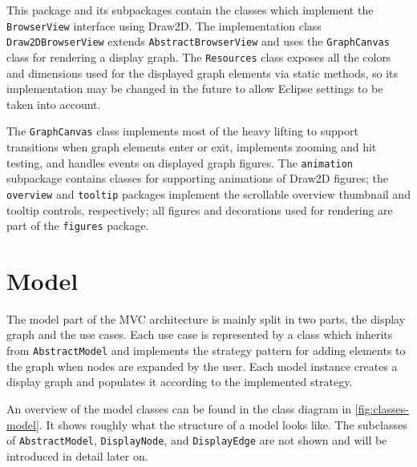 \begin{description}
   This package and its subpackages contain the classes which implement the 
  \lstinline|BrowserView| interface using Draw2D\footnotemark{}. The implementation class \lstinline|Draw2DBrowserView| 
  extends \lstinline|AbstractBrowserView| and uses the \lstinline|GraphCanvas| class for rendering a display graph. The 
  \lstinline|Resources| class exposes all the colors and dimensions used for the displayed graph elements via static 
  methods, so its implementation may be changed in the future to allow Eclipse settings to be taken into account.
  
  
  The \lstinline|GraphCanvas| class implements most of the heavy lifting to support transitions when graph elements 
  enter or exit, implements zooming and hit testing, and handles events on displayed graph figures. The 
  \lstinline|animation| subpackage contains classes for supporting animations of Draw2D figures; the 
  \lstinline|overview| and \lstinline|tooltip| packages implement the scrollable overview thumbnail and tooltip 
  controls, respectively; all figures and decorations used for rendering are part of the \lstinline|figures| package.
\end{description}


\section{Model}

The model part of the MVC architecture is mainly split in two parts, the display graph and the use cases. Each use case 
is represented by a class which inherits from \lstinline|AbstractModel| and implements the strategy pattern
\cite[pp.~315--323]{designpatterns} for adding elements to the graph when nodes are expanded by the user. Each model 
instance creates a display graph and populates it according to the implemented strategy.

An overview of the model classes can be found in the class diagram in \autoref{fig:classes-model}. It shows roughly 
what the structure of a model looks like. The subclasses of \lstinline|AbstractModel|, \lstinline|DisplayNode|, and 
\lstinline|DisplayEdge| are not shown and will be introduced in detail later on.


